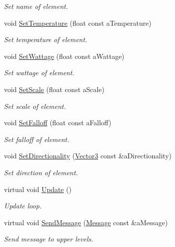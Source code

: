 \begin{DoxyCompactItemize}
\begin{DoxyCompactList}\small\item\em Set name of element. \end{DoxyCompactList}\item 
void \hyperlink{classChemistryElement_ac2a55f91d14f07a86ee10f6aaa8802ed}{Set\+Temperature} (float const a\+Temperature)
\begin{DoxyCompactList}\small\item\em Set temperature of element. \end{DoxyCompactList}\item 
void \hyperlink{classChemistryElement_a90356bbc254d51e80e79c2ceb19ccf9a}{Set\+Wattage} (float const a\+Wattage)
\begin{DoxyCompactList}\small\item\em Set wattage of element. \end{DoxyCompactList}\item 
void \hyperlink{classChemistryElement_a7bdc6818f12b9eed6c6d14bc2afa32b6}{Set\+Scale} (float const a\+Scale)
\begin{DoxyCompactList}\small\item\em Set scale of element. \end{DoxyCompactList}\item 
void \hyperlink{classChemistryElement_a99fe699e20a6ea8a0560331ee399cc38}{Set\+Falloff} (float const a\+Falloff)
\begin{DoxyCompactList}\small\item\em Set falloff of element. \end{DoxyCompactList}\item 
void \hyperlink{classChemistryElement_a1611a832f8a4a8e0eee05f07b632733d}{Set\+Directionality} (\hyperlink{structVector3}{Vector3} const \&a\+Directionality)
\begin{DoxyCompactList}\small\item\em Set direction of element. \end{DoxyCompactList}\item 
virtual void \hyperlink{classChemistryElement_abc0f9525c2f510d61a930fbd7f27ee78}{Update} ()
\begin{DoxyCompactList}\small\item\em Update loop. \end{DoxyCompactList}\item 
virtual void \hyperlink{classChemistryElement_ac16ea591ab9d999ae6bc5a9eb6599d5b}{Send\+Message} (\hyperlink{classMessage}{Message} const \&a\+Message)
\begin{DoxyCompactList}\small\item\em Send message to upper levels. \end{DoxyCompactList}\item 

\end{DoxyCompactItemize}
